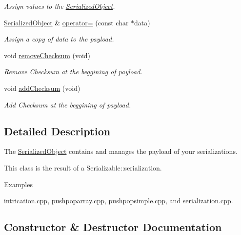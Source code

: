 \begin{DoxyCompactItemize}
\begin{DoxyCompactList}\small\item\em Assign values to the \mbox{\hyperlink{classbas_1_1SerializedObject}{Serialized\+Object}}. \end{DoxyCompactList}\item 
\mbox{\hyperlink{classbas_1_1SerializedObject}{Serialized\+Object}} \& \mbox{\hyperlink{classbas_1_1SerializedObject_a8d7c978da2ec196d541f04d327d12bbc}{operator=}} (const char $\ast$data)
\begin{DoxyCompactList}\small\item\em Assign a copy of data to the payload. \end{DoxyCompactList}\item 
void \mbox{\hyperlink{classbas_1_1SerializedObject_a1cb43a946e9f7000eb2b24586a91ad3b}{remove\+Checksum}} (void)
\begin{DoxyCompactList}\small\item\em Remove Checksum at the beggining of payload. \end{DoxyCompactList}\item 
void \mbox{\hyperlink{classbas_1_1SerializedObject_af8f20a4d1dc60ae0f30c0de483c86ee8}{add\+Checksum}} (void)
\begin{DoxyCompactList}\small\item\em Add Checksum at the beggining of payload. \end{DoxyCompactList}\end{DoxyCompactItemize}


\subsection{Detailed Description}
The \mbox{\hyperlink{classbas_1_1SerializedObject}{Serialized\+Object}} contains and manages the payload of your serializations. 

This class is the result of a Serializable\+::serialization. \begin{Desc}
\item[Examples]\par
\mbox{\hyperlink{intrication_8cpp-example}{intrication.\+cpp}}, \mbox{\hyperlink{pushpoparray_8cpp-example}{pushpoparray.\+cpp}}, \mbox{\hyperlink{pushpopsimple_8cpp-example}{pushpopsimple.\+cpp}}, and \mbox{\hyperlink{serialization_8cpp-example}{serialization.\+cpp}}.\end{Desc}


\subsection{Constructor \& Destructor Documentation}
\mbox{\label{classbas_1_1SerializedObject_a5b7956e31d74e4fe3f8e2c2c84da2001}} 
